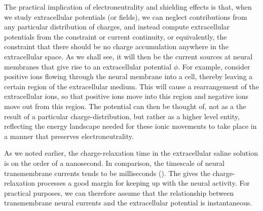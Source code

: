 The practical implication of electroneutrality and shielding effects is that, when we study extracellular potentials (or fields), we can neglect contributions from any particular distribution of charges, and instead compute extracellular potentials from the constraint or current continuity, or equivalently, the constraint that  there should be no charge accumulation anywhere in the extracellular space. As we shall see, it will then be the current sources at neural membranes that give rise to an extracellular potential $\phi$. For example, consider positive ions flowing through the neural membrane into a cell, thereby leaving a certain region of the extracellular medium. This will cause a rearrangement of the extracellular ions, so that positive ions move into this region and negative ions move out from this region. The potential can then be thought of, not as a the result of a particular charge-distribution, but rather as a higher level entity, reflecting the energy landscape needed for these ionic movements to take place in a manner that preserves electroneutrality. 

As we noted earlier, the charge-relaxation time in the extracellular saline solution is on the order of a nanosecond. In comparison, the timescale of neural transmembrane currents tends to be milliseconds (). The gives the charge-relaxation processes a good margin for keeping up with the neural activity. For practical purposes, we can therefore assume that the relationship between transmembrane neural currents and the extracellular potential is instantaneous.


